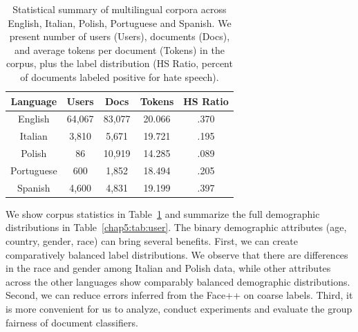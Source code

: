 \begin{table}[tb!]
\centering
\begin{tabular}{c||cccc}
Language & Users & Docs & Tokens & HS Ratio \\\hline\hline
English & 64,067 & 83,077 & 20.066 & .370 \\
Italian & 3,810 & 5,671 & 19.721 & .195 \\
Polish & 86 & 10,919 & 14.285 & .089 \\
Portuguese & 600 & 1,852 & 18.494 & .205 \\
Spanish & 4,600 & 4,831 & 19.199 & .397
\end{tabular}
\caption{Statistical summary of multilingual corpora across English, Italian, Polish, Portuguese and Spanish. We present number of users (Users), documents (Docs), and average tokens per document (Tokens) in the corpus, 
plus the label distribution (HS Ratio, percent of documents labeled positive for hate speech).}
\label{chap5:tab:corpus}
\end{table}

We show corpus statistics in Table~\ref{chap5:tab:corpus} and summarize the full demographic distributions in Table~\ref{chap5:tab:user}. 
The binary demographic attributes (age, country, gender, race) can bring several benefits. 
First, we can create comparatively balanced label distributions. 
We observe that there are differences in the race and gender among Italian and Polish data, while other attributes across the other languages show comparably balanced demographic distributions.
Second, we can reduce errors inferred from the Face++ on coarse labels.
Third, it is more convenient for us to analyze, conduct experiments and evaluate the group fairness of document classifiers.


